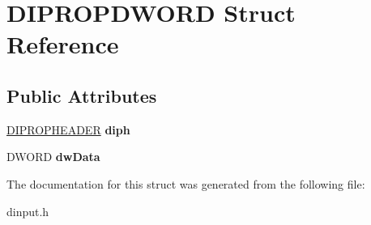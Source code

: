 \hypertarget{struct_d_i_p_r_o_p_d_w_o_r_d}{\section{D\-I\-P\-R\-O\-P\-D\-W\-O\-R\-D Struct Reference}
\label{struct_d_i_p_r_o_p_d_w_o_r_d}
}
\subsection*{Public Attributes}
\begin{DoxyCompactItemize}
\item 
\hypertarget{struct_d_i_p_r_o_p_d_w_o_r_d_a18a73c7b6d45204f1d92ddcb2dc5db4a}{\hyperlink{struct_d_i_p_r_o_p_h_e_a_d_e_r}{D\-I\-P\-R\-O\-P\-H\-E\-A\-D\-E\-R} {\bfseries diph}}\label{struct_d_i_p_r_o_p_d_w_o_r_d_a18a73c7b6d45204f1d92ddcb2dc5db4a}

\item 
\hypertarget{struct_d_i_p_r_o_p_d_w_o_r_d_ae5fee0e4c685d2326c7f63b3707874a9}{D\-W\-O\-R\-D {\bfseries dw\-Data}}\label{struct_d_i_p_r_o_p_d_w_o_r_d_ae5fee0e4c685d2326c7f63b3707874a9}

\end{DoxyCompactItemize}


The documentation for this struct was generated from the following file\-:\begin{DoxyCompactItemize}
\item 
dinput.\-h\end{DoxyCompactItemize}

